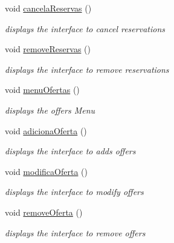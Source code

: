 \begin{DoxyCompactItemize}
\mbox{\label{classEmpresa_aa0b169a112c75b6fd1bc80128720282e}} 
void \hyperlink{classEmpresa_aa0b169a112c75b6fd1bc80128720282e}{cancela\+Reservas} ()
\begin{DoxyCompactList}\small\item\em displays the interface to cancel reservations \end{DoxyCompactList}\item 
\mbox{\label{classEmpresa_a3e0ee0b5d92f0cd655a26095229849f1}} 
void \hyperlink{classEmpresa_a3e0ee0b5d92f0cd655a26095229849f1}{remove\+Reservas} ()
\begin{DoxyCompactList}\small\item\em displays the interface to remove reservations \end{DoxyCompactList}\item 
\mbox{\label{classEmpresa_a3cab1a61ff84c5b20ac2faa6251e25ed}} 
void \hyperlink{classEmpresa_a3cab1a61ff84c5b20ac2faa6251e25ed}{menu\+Ofertas} ()
\begin{DoxyCompactList}\small\item\em displays the offers Menu \end{DoxyCompactList}\item 
\mbox{\label{classEmpresa_ae244a8ae3afb85eb5e9e5febce8b8728}} 
void \hyperlink{classEmpresa_ae244a8ae3afb85eb5e9e5febce8b8728}{adiciona\+Oferta} ()
\begin{DoxyCompactList}\small\item\em displays the interface to adds offers \end{DoxyCompactList}\item 
\mbox{\label{classEmpresa_ac8948065c65d5c02cb30103118f502d4}} 
void \hyperlink{classEmpresa_ac8948065c65d5c02cb30103118f502d4}{modifica\+Oferta} ()
\begin{DoxyCompactList}\small\item\em displays the interface to modify offers \end{DoxyCompactList}\item 
\mbox{\label{classEmpresa_a5b5c42d733ccee37f932db5db8aec243}} 
void \hyperlink{classEmpresa_a5b5c42d733ccee37f932db5db8aec243}{remove\+Oferta} ()
\begin{DoxyCompactList}\small\item\em displays the interface to remove offers \end{DoxyCompactList}\item 

\end{DoxyCompactItemize}
